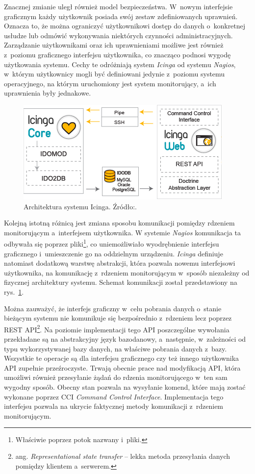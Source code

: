 Znacznej zmianie uległ również model bezpieczeństwa. W~nowym
interfejsie graficznym każdy użytkownik posiada swój zestaw
zdefiniowanych uprawnień. Oznacza to, że można ograniczyć
użytkownikowi dostęp do danych o~konkretnej usłudze lub odmówić
wykonywania niektórych czynności administracyjnych. Zarządzanie
użytkownikami oraz ich uprawnieniami możliwe jest również z~poziomu
graficznego interfejsu użytkownika, co znacząco podnosi wygodę
użytkowania systemu. Cechy te odróżniają system {\em Icinga} od systemu
{\em Nagios}, w~którym użytkownicy mogli być definiowani jedynie z~poziomu
systemu operacyjnego, na którym uruchomiony jest system monitorujący,
a~ich uprawnienia były jednakowe.

\begin{figure}[ht]
  \caption{Architektura systemu Icinga. Źródło:\cite{www:IcingaDoc}.}
  \label{fig:IcingaOverview}
  \centering
\includegraphics{img/icingaOverview.png}
\end{figure}

Kolejną istotną różnicą jest zmiana sposobu komunikacji pomiędzy
rdzeniem monitorującym a~interfejsem użytkownika. W systemie {\em Nagios}
komunikacja ta odbywała się poprzez pliki\footnote{Właściwie poprzez
  potok nazwany i~pliki.}, co uniemożliwiało wyodrębnienie interfejsu
graficznego i~umieszczenie go na oddzielnym urządzeniu. {\em Icinga}
definiuje natomiast dodatkową warstwę abstrakcji, która pozwala nowemu
interfejsowi użytkownika, na komunikację z~rdzeniem monitorującym
w~sposób niezależny od fizycznej architektury systemu. Schemat
komunikacji został przedstawiony na rys.~\ref{fig:IcingaOverview}.

Można zauważyć, że interfejs graficzny w~celu pobrania danych o~stanie
bieżącym systemu nie komunikuje się bezpośrednio z~rdzeniem lecz
poprzez REST API\footnote{ang. {\em Representational state transfer}
  -- lekka metoda przesyłania danych pomiędzy klientem
  a~serwerem.}. Na poziomie implementacji tego API poszczególne
wywołania przekładane są na abstrakcyjny język bazodanowy, a~następnie,
w~zależności od typu wykorzystywanej bazy danych, na właściwe pobrania
danych z~bazy. Wszystkie te operacje są dla interfejsu graficznego czy
też innego użytkownika API zupełnie przeźroczyste. Trwają obecnie
prace nad modyfikacją API, która umożliwi również przesyłanie żądań do
rdzenia monitorującego w~ten sam wygodny sposób. Obecny stan pozwala
na wysyłanie komend, które mają zostać wykonane poprzez CCI {\em
  Command Control Interface}. Implementacja tego interfejsu pozwala na
ukrycie faktycznej metody komunikacji z~rdzeniem monitorującym.

